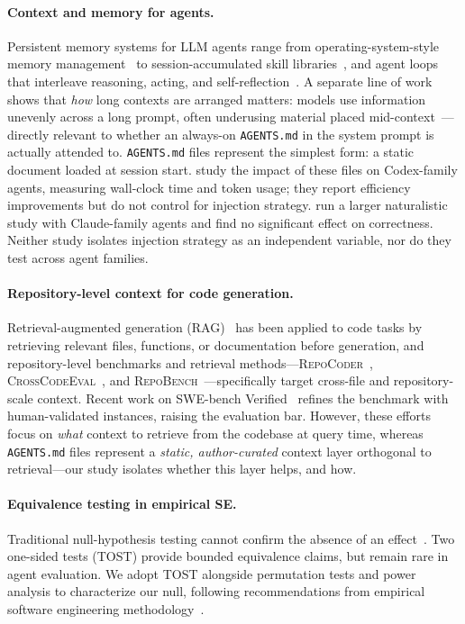 \documentclass[11pt]{article}
\newcommand{\agentsmd}{\texttt{AGENTS.md}}
\begin{document}
\paragraph{Context and memory for agents.}
Persistent memory systems for LLM agents range from operating-system-style memory management~\citep{memgpt} to session-accumulated skill libraries~\citep{voyager}, and agent loops that interleave reasoning, acting, and self-reflection~\citep{react,reflexion}.
A separate line of work shows that \emph{how} long contexts are arranged matters: models use information unevenly across a long prompt, often underusing material placed mid-context~\citep{lostinthemiddle}---directly relevant to whether an always-on \agentsmd{} in the system prompt is actually attended to.
\agentsmd{} files represent the simplest form: a static document loaded at session start.
\citet{paper1} study the impact of these files on Codex-family agents, measuring wall-clock time and token usage; they report efficiency improvements but do not control for injection strategy.
\citet{paper2} run a larger naturalistic study with Claude-family agents and find no significant effect on correctness.
Neither study isolates injection strategy as an independent variable, nor do they test across agent families.

\paragraph{Repository-level context for code generation.}
Retrieval-augmented generation (RAG)~\citep{rag} has been applied to code tasks by retrieving relevant files, functions, or documentation before generation, and repository-level benchmarks and retrieval methods---\textsc{RepoCoder}~\citep{repocoder}, \textsc{CrossCodeEval}~\citep{crosscodeeval}, and \textsc{RepoBench}~\citep{repobench}---specifically target cross-file and repository-scale context.
Recent work on SWE-bench Verified~\citep{swebenchverified} refines the benchmark with human-validated instances, raising the evaluation bar.
However, these efforts focus on \emph{what} context to retrieve from the codebase at query time, whereas \agentsmd{} files represent a \emph{static, author-curated} context layer orthogonal to retrieval---our study isolates whether this layer helps, and how.

\paragraph{Equivalence testing in empirical SE.}
Traditional null-hypothesis testing cannot confirm the absence of an effect~\citep{tost}.
Two one-sided tests (TOST) provide bounded equivalence claims, but remain rare in agent evaluation.
We adopt TOST alongside permutation tests and power analysis to characterize our null, following recommendations from empirical software engineering methodology~\citep{empiricalse}.
\end{document}
